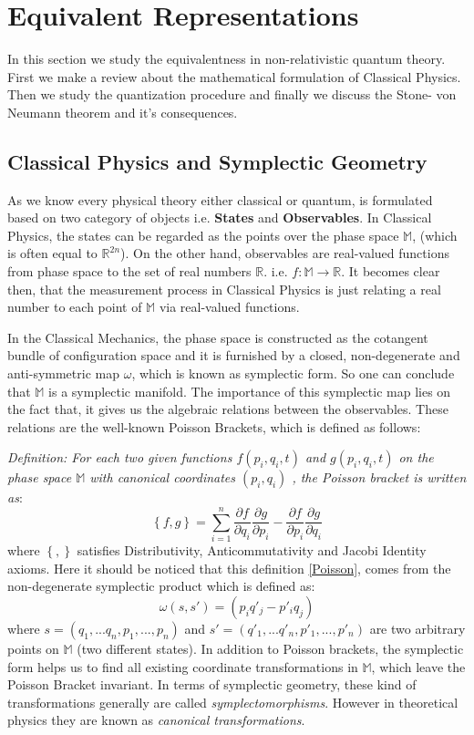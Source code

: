 \documentclass[12pt,a4paper]{article}
\begin{document}
\section{Equivalent Representations}\label{section.UIR}
In this section we study the equivalentness in non-relativistic quantum theory. First we make a review about the mathematical formulation of Classical Physics. Then we study the quantization procedure and finally we discuss the Stone- von Neumann theorem and it's consequences.
\subsection{Classical Physics and Symplectic Geometry}\label{Classical physics}
As we know every physical theory either classical or quantum, is formulated based on two category of objects i.e. \textbf{States} and \textbf{Observables}. In Classical Physics, the states can be regarded as the points over the phase space $\mathbb{M}$, (which is often equal to $\mathbb{R}^{2n}$). On the other hand, observables are real-valued functions from phase space to the set of real numbers $\mathbb{R}$. i.e. $f: \mathbb{M} \rightarrow \mathbb{R}$. It becomes clear then, that the measurement process in Classical Physics is just relating a real number to each point of $\mathbb{M}$ via real-valued functions.

In the Classical Mechanics, the phase space is constructed as the cotangent bundle of configuration space and it is furnished by a closed, non-degenerate and anti-symmetric map $\mathbb{\omega}$, which is known as symplectic form. So one can conclude that $\mathbb{M}$ is a symplectic manifold. The importance of this symplectic map lies on the fact that, it gives us the algebraic relations between the observables. These relations are the well-known Poisson Brackets, which is defined as follows:

\emph{Definition: For each two given functions $f(p_i, q_i, t)$ and $g(p_i, q_i, t)$ on the phase space $\mathbb{M}$ with canonical coordinates $(p_i, q_i)$
, the Poisson bracket is written as}:
\begin{equation}\label{Poisson}
\left\{f, g\right\}= \sum_{i=1}^n\frac{\partial f}{\partial q_i}\frac{\partial g}{\partial p_i}-\frac{\partial f}{\partial p_i}\frac{\partial g}{\partial q_i}
\end{equation}
where $\left\{ ,\right\}$ satisfies Distributivity, Anticommutativity and Jacobi Identity axioms.
Here it should be noticed that this definition \ref{Poisson}, comes from the non-degenerate symplectic product which is defined as:
\begin{equation}\label{Poisson 2}
 \omega (s,s')= (p_i q'_j - p'_i q_j)
\end{equation}
 where $s=(q_1,...q_n, p_1,...,p_n)$ and $s'=(q'_1,...q'_n, p'_1,...,p'_n)$ are two arbitrary points on $\mathbb{M}$ (two different states). In addition to Poisson brackets, the symplectic form helps us to find all existing coordinate transformations in $\mathbb{M}$, which leave the Poisson Bracket invariant. In terms of symplectic geometry, these kind of transformations generally are called \emph{symplectomorphisms}. However in theoretical physics they are known as \emph{canonical transformations}.
\end{document}
